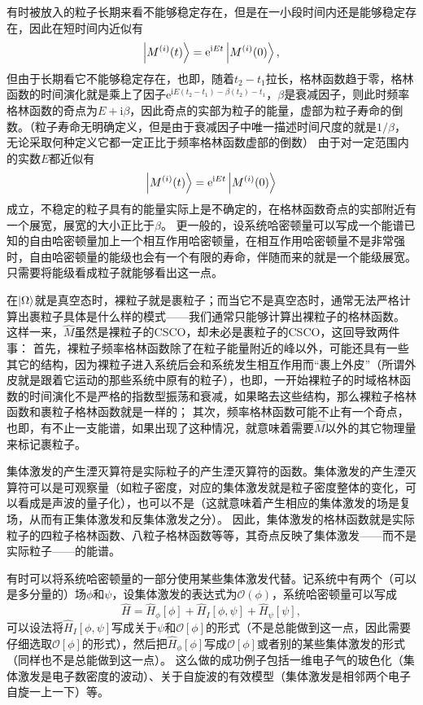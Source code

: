 \documentclass[hyperref, UTF8, a4paper]{ctexart}
\newcommand*{\ii}{\mathrm{i}}
\newcommand*{\ee}{\mathrm{e}}
\begin{document}
有时被放入的粒子长期来看不能够稳定存在，但是在一小段时间内还是能够稳定存在，因此在短时间内近似有
\[
    \ket{M^{(i)}(t)} = \ee^{\ii E t} \ket{M^{(i)}(0)},
\]
但由于长期看它不能够稳定存在，也即，随着$t_2-t_1$拉长，格林函数趋于零，格林函数的时间演化就是乘上了因子$\ee^{\ii E (t_2 - t_1) - \beta (t_2) - t_1}$，$\beta$是衰减因子，则此时频率格林函数的奇点为$E + \ii \beta$，因此奇点的实部为粒子的能量，虚部为粒子寿命的倒数。（粒子寿命无明确定义，但是由于衰减因子中唯一描述时间尺度的就是$1/\beta$，无论采取何种定义它都一定正比于频率格林函数虚部的倒数）
由于对一定范围内的实数$E$都近似有
\[
    \ket{M^{(i)}(t)} = \ee^{\ii E t} \ket{M^{(i)}(0)}
\]
成立，不稳定的粒子具有的能量实际上是不确定的，在格林函数奇点的实部附近有一个展宽，展宽的大小正比于$\beta$。
更一般的，设系统哈密顿量可以写成一个能谱已知的自由哈密顿量加上一个相互作用哈密顿量，在相互作用哈密顿量不是非常强时，自由哈密顿量的能级也会有一个有限的寿命，伴随而来的就是一个能级展宽。只需要将能级看成粒子就能够看出这一点。

在$\ket{\Omega}$就是真空态时，裸粒子就是裹粒子；而当它不是真空态时，通常无法严格计算出裹粒子具体是什么样的模式——我们通常只能够计算出裸粒子的格林函数。
这样一来，$\hat{M}$虽然是裸粒子的CSCO，却未必是裹粒子的CSCO，这回导致两件事：
首先，裸粒子频率格林函数除了在粒子能量附近的峰以外，可能还具有一些其它的结构，因为裸粒子进入系统后会和系统发生相互作用而“裹上外皮”（所谓外皮就是跟着它运动的那些系统中原有的粒子），也即，一开始裸粒子的时域格林函数的时间演化不是严格的指数型振荡和衰减，如果略去这些结构，那么裸粒子格林函数和裹粒子格林函数就是一样的；
其次，频率格林函数可能不止有一个奇点，也即，有不止一支能谱，如果出现了这种情况，就意味着需要$\hat{M}$以外的其它物理量来标记裹粒子。

集体激发的产生湮灭算符是实际粒子的产生湮灭算符的函数。集体激发的产生湮灭算符可以是可观察量（如粒子密度，对应的集体激发就是粒子密度整体的变化，可以看成是声波的量子化），也可以不是（这就意味着产生相应的集体激发的场是复场，从而有正集体激发和反集体激发之分）。
因此，集体激发的格林函数就是实际粒子的四粒子格林函数、八粒子格林函数等等，其奇点反映了集体激发——而不是实际粒子——的能谱。

有时可以将系统哈密顿量的一部分使用某些集体激发代替。记系统中有两个（可以是多分量的）场$\phi$和$\psi$，设集体激发的表达式为$\mathcal{O}(\phi)$，系统哈密顿量可以写成
\[
    \hat{H} = \hat{H}_\phi[\phi] + \hat{H}_{I}[\phi, \psi] + \hat{H}_\psi[\psi],
\]
可以设法将$\hat{H}_{I}[\phi, \psi]$写成关于$\psi$和$\mathcal{O}[\phi]$的形式（不是总能做到这一点，因此需要仔细选取$\mathcal{O}[\phi]$的形式），然后把$\hat{H}_\phi[\phi]$写成$\mathcal{O}[\phi]$或者别的某些集体激发的形式（同样也不是总能做到这一点）。
这么做的成功例子包括一维电子气的玻色化（集体激发是电子数密度的波动）、关于自旋波的有效模型（集体激发是相邻两个电子自旋一上一下）等。
\end{document}
